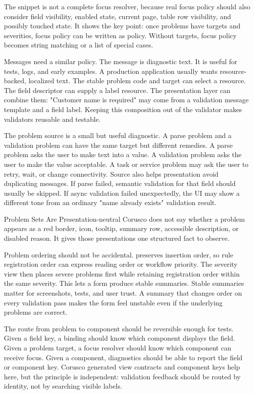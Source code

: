 The snippet is not a complete focus resolver, because real focus policy should
also consider field visibility, enabled state, current page, table row
visibility, and possibly touched state. It shows the key point: once problems
have targets and severities, focus policy can be written as policy. Without
targets, focus policy becomes string matching or a list of special cases.

Messages need a similar policy. The  message is diagnostic text.
It is useful for tests, logs, and early examples. A production application
usually wants resource-backed, localized text. The stable problem code and
target can select a resource. The field descriptor can supply a label resource.
The presentation layer can combine them: "Customer name is required" may come
from a validation message template and a field label. Keeping this composition
out of the validator makes validators reusable and testable.

The problem source is a small but useful diagnostic. A parse problem and a
validation problem can have the same target but different remedies. A parse
problem asks the user to make text into a value. A validation problem asks the
user to make the value acceptable. A task or service problem may ask the user
to retry, wait, or change connectivity. Source also helps presentation avoid
duplicating messages. If parse failed, semantic validation for that field
should usually be skipped. If async validation failed unexpectedly, the UI may
show a different tone from an ordinary "name already exists" validation result.

\begin{coruscobox}{Problem Sets Are Presentation-neutral}
Corusco does not say whether a problem appears as a red border, icon, tooltip,
summary row, accessible description, or disabled reason. It gives those
presentations one structured fact to observe.
\end{coruscobox}

Problem ordering should not be accidental.  preserves insertion
order, so rule registration order can express reading order or workflow
priority. The severity view then places severe problems first while retaining
registration order within the same severity. This lets a form produce stable
summaries. Stable summaries matter for screenshots, tests, and user trust. A
summary that changes order on every validation pass makes the form feel
unstable even if the underlying problems are correct.

The route from problem to component should be reversible enough for tests.
Given a field key, a binding should know which component displays the field.
Given a problem target, a focus resolver should know which component can
receive focus. Given a component, diagnostics should be able to report the
field or component key. Corusco generated view contracts and component keys
help here, but the principle is independent: validation feedback should be
routed by identity, not by searching visible labels.

